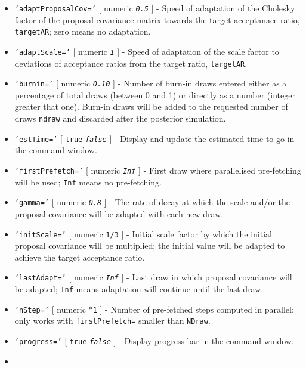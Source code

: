  \begin{itemize}
 \item
   \texttt{'adaptProposalCov='} {[} numeric \textbar{}
   \emph{\texttt{0.5}} {]} - Speed of adaptation of the Cholesky factor
   of the proposal covariance matrix towards the target acceptanace
   ratio, \texttt{targetAR}; zero means no adaptation.
 \item
   \texttt{'adaptScale='} {[} numeric \textbar{} \emph{\texttt{1}} {]} -
   Speed of adaptation of the scale factor to deviations of acceptance
   ratios from the target ratio, \texttt{targetAR}.
 \item
   \texttt{'burnin='} {[} numeric \textbar{} \emph{\texttt{0.10}} {]} -
   Number of burn-in draws entered either as a percentage of total draws
   (between 0 and 1) or directly as a number (integer greater that one).
   Burn-in draws will be added to the requested number of draws
   \texttt{ndraw} and discarded after the posterior simulation.
 \item
   \texttt{'estTime='} {[} \texttt{true} \textbar{} \emph{\texttt{false}}
   {]} - Display and update the estimated time to go in the command
   window.
 \item
   \texttt{'firstPrefetch='} {[} numeric \textbar{} \emph{\texttt{Inf}}
   {]} - First draw where parallelised pre-fetching will be used;
   \texttt{Inf} means no pre-fetching.
 \item
   \texttt{'gamma='} {[} numeric \textbar{} \emph{\texttt{0.8}} {]} - The
   rate of decay at which the scale and/or the proposal covariance will
   be adapted with each new draw.
 \item
   \texttt{'initScale='} {[} numeric \textbar{} \texttt{1/3} {]} -
   Initial scale factor by which the initial proposal covariance will be
   multiplied; the initial value will be adapted to achieve the target
   acceptance ratio.
 \item
   \texttt{'lastAdapt='} {[} numeric \textbar{} \emph{\texttt{Inf}} {]} -
   Last draw in which proposal covariance will be adapted; \texttt{Inf}
   means adaptation will continue until the last draw.
 \item
   \texttt{'nStep='} {[} numeric \textbar{} *\texttt{1} {]} - Number of
   pre-fetched steps computed in parallel; only works with
   \texttt{firstPrefetch=} smaller than \texttt{NDraw}.
 \item
   \texttt{'progress='} {[} \texttt{true} \textbar{}
   \emph{\texttt{false}} {]} - Display progress bar in the command
   window.
 \item

\end{itemize}
